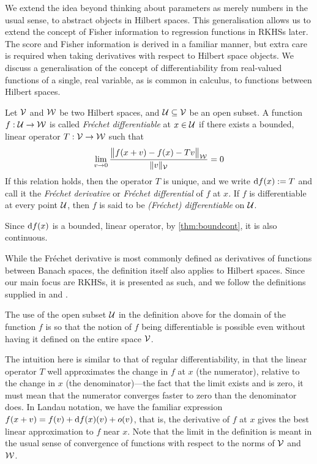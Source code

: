 We extend the idea beyond thinking about parameters as merely numbers in the usual sense, to abstract objects in Hilbert spaces. 
This generalisation allows us to extend the concept of Fisher information to regression functions in RKHSs later.
The score and Fisher information is derived in a familiar manner, but extra care is required when taking derivatives with respect to Hilbert space objects.  
We discuss a generalisation of the concept of differentiability from real-valued functions of a single, real variable, as is common in calculus, to functions between Hilbert spaces.

\begin{definition}\label{def:frechet}
  Let ${\mathcal V}$ and ${\mathcal W}$ be two Hilbert spaces, and ${\mathcal U} \subseteq {\mathcal V}$ be an open subset.
  A function $f:{\mathcal U}\to{\mathcal W}$ is called \emph{Fréchet differentiable} at $x \in {\mathcal U}$ if there exists a bounded, linear operator $T:{\mathcal V}\to{\mathcal W}$ such that 
  \[
    \lim_{v\to 0} \frac{\big\Vert f(x+v) - f(x) - T v \big\Vert_{{\mathcal W}}}{\lVert v\rVert_{\mathcal V}} = 0
  \]
  If this relation holds, then the operator $T$ is unique, and we write $\text{d} f(x) := T$ and call it the \emph{Fréchet derivative} or \emph{Fréchet differential} of $f$ at $x$.
  If $f$ is differentiable at every point ${\mathcal U}$, then $f$ is said to be \emph{(Fréchet) differentiable} on ${\mathcal U}$.
\end{definition}

\begin{remark}
  Since $\text{d} f(x)$ is a bounded, linear operator, by \cref{thm:boundcont}, it is also continuous. 
\end{remark}

\begin{remark}
  While the Fréchet derivative is most commonly defined as derivatives of functions between Banach spaces,  the definition itself also applies to Hilbert spaces.
  Since our main focus are RKHSs, it is presented as such, and we follow the definitions supplied in \citet[Definition 3.6.5]{balakrishnan1981applied} and \citet[Section 6]{bouboulis2011extension}.
\end{remark}

\begin{remark}
  The use of the open subset ${\mathcal U}$ in the definition above for the domain of the function $f$ is so that the notion of $f$ being differentiable is possible even without having it defined on the entire space ${\mathcal V}$.
\end{remark}

The intuition here is similar to that of regular differentiability, in that the linear operator $T$ well approximates the change in $f$ at $x$ (the numerator), relative to the change in $x$ (the denominator)---the fact that the limit exists and is zero, it must mean that the numerator converges faster to zero than the denominator does.
In Landau notation, we have the familiar expression $f(x+v) = f(v) + \text{d} f(x)(v) + o(v)$, that is, the derivative of $f$ at $x$ gives the best linear approximation to $f$ near $x$.
Note that the limit in the definition is meant in the usual sense of convergence of functions with respect to the norms of ${\mathcal V}$ and ${\mathcal W}$.

